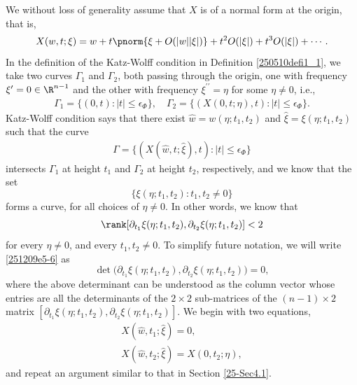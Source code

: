 \documentclass{article}
\numberwithin{equation}{section}
\theoremstyle{plain}
\begin{document}
We without loss of generality assume that $X$ is of a normal form at the origin, that is, 
\begin{equation}
X(w, t; \xi)=w+ t\pnorm{
\xi+ O(|w||\xi|)
}+ t^2 O(|\xi|)+ t^3 O(|\xi|)+\cdots.
\end{equation}
In the definition of the Katz-Wolff condition in Definition \ref{250510defi1_1}, we take two curves $\Gamma_1$ and $\Gamma_2$, both passing through the origin, one with frequency $\xi^\prime=0\in \R^{n-1}$ and the other with frequency $\xi^{\prime\prime}=\eta$ for some $\eta\neq 0$, i.e.,
\begin{align}
    \Gamma_1=\{(0,t):|t|\le\epsilon_\Phi\},\quad \Gamma_2=\{(X(0,t;\eta),t):|t|\le\epsilon_\Phi\}.
\end{align}
Katz-Wolff condition says that there exist $\hat{w}=w(\eta;t_1,t_2)$ and $\hat{\xi}=\xi(\eta;t_1,t_2)$ such that the curve
\begin{align}
    \Gamma=\{(X(\hat{w},t;\hat{\xi}),t):|t|\le\epsilon_\Phi\}
\end{align}
intersects $\Gamma_1$ at height $t_1$ and $\Gamma_2$ at height $t_2$, respectively, and we know that the set 
\begin{equation}
    \{ \xi(\eta; t_1, t_2): t_1, t_2\neq 0\}
\end{equation}
forms a curve, for all choices of $\eta\neq 0$. In other words, we know that 
\begin{equation}\label{251209e5-6}
\rank[
\partial_{t_1} \xi(\eta; t_1, t_2), \partial_{t_2} \xi(\eta; t_1, t_2)
]< 2
\end{equation}
for every $\eta\neq 0$, and every $t_1, t_2\neq 0$. To simplify future notation, we will write \eqref{251209e5-6} as 
\begin{equation}\label{251209e5-7}
\det\big(
\partial_{t_1} \xi(\eta; t_1, t_2), \partial_{t_2} \xi(\eta; t_1, t_2)
\big)=0,
\end{equation}
where the above determinant can be understood as the column vector whose entries are all the determinants of the $2\times 2$ sub-matrices of the $(n-1)\times 2$ matrix $[
\partial_{t_1} \xi(\eta; t_1, t_2), \partial_{t_2} \xi(\eta; t_1, t_2)
]$. We begin with two equations,
\begin{align}
    X(\hat{w},t_1;\hat{\xi})=0,\quad\quad\quad\ \  \label{251209e5-8} \\
    X(\hat{w},t_2;\hat{\xi})= X(0,t_2;\eta), \label{251209e5-9}
\end{align}
and repeat an argument similar to that in Section \ref{25-Sec4.1}.\\
\end{document}
